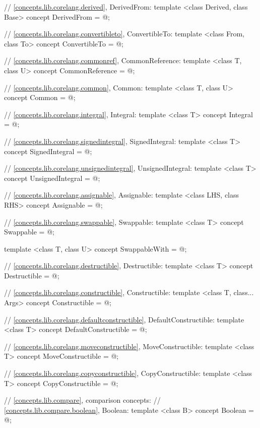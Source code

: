 \begin{addedblock}
\begin{codeblock}
{  // \ref{concepts.lib.corelang.derived}, DerivedFrom:
  template <class Derived, class Base>
  concept DerivedFrom = @\seebelow@;

  // \ref{concepts.lib.corelang.convertibleto}, ConvertibleTo:
  template <class From, class To>
  concept ConvertibleTo = @\seebelow@;

  // \ref{concepts.lib.corelang.commonref}, CommonReference:
  template <class T, class U>
  concept CommonReference = @\seebelow@;

  // \ref{concepts.lib.corelang.common}, Common:
  template <class T, class U>
  concept Common = @\seebelow@;

  // \ref{concepts.lib.corelang.integral}, Integral:
  template <class T>
  concept Integral = @\seebelow@;

  // \ref{concepts.lib.corelang.signedintegral}, SignedIntegral:
  template <class T>
  concept SignedIntegral = @\seebelow@;

  // \ref{concepts.lib.corelang.unsignedintegral}, UnsignedIntegral:
  template <class T>
  concept UnsignedIntegral = @\seebelow@;

  // \ref{concepts.lib.corelang.assignable}, Assignable:
  template <class LHS, class RHS>
  concept Assignable = @\seebelow@;

  // \ref{concepts.lib.corelang.swappable}, Swappable:
  template <class T>
  concept Swappable = @\seebelow@;

  template <class T, class U>
  concept SwappableWith = @\seebelow@;

  // \ref{concepts.lib.corelang.destructible}, Destructible:
  template <class T>
  concept Destructible = @\seebelow@;

  // \ref{concepts.lib.corelang.constructible}, Constructible:
  template <class T, class... Args>
  concept Constructible = @\seebelow@;

  // \ref{concepts.lib.corelang.defaultconstructible}, DefaultConstructible:
  template <class T>
  concept DefaultConstructible = @\seebelow@;

  // \ref{concepts.lib.corelang.moveconstructible}, MoveConstructible:
  template <class T>
  concept MoveConstructible = @\seebelow@;

  // \ref{concepts.lib.corelang.copyconstructible}, CopyConstructible:
  template <class T>
  concept CopyConstructible = @\seebelow@;

  // \ref{concepts.lib.compare}, comparison concepts:
  // \ref{concepts.lib.compare.boolean}, Boolean:
  template <class B>
  concept Boolean = @\seebelow@;

}
\end{codeblock}
\end{addedblock}

